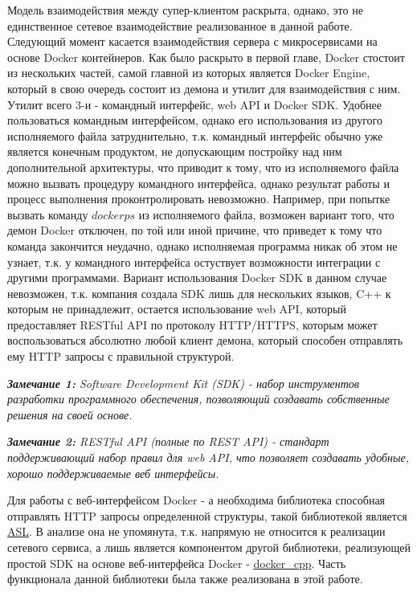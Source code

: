 \documentclass[a4paper, 14pt]{extreport}
\begin{document}
\par Модель взаимодействия между супер-клиентом раскрыта, однако, это не единственное сетевое взаимодействие реализованное в данной работе.
Следующий момент касается взаимодействия сервера с микросервисами на основе Docker контейнеров. Как было раскрыто в первой главе, Docker 
стостоит из нескольких частей, самой главной из которых является Docker Engine, который в свою очередь состоит из демона и утилит для 
взаимодействия с ним. Утилит всего 3-и - командный интерфейс, web API и Docker SDK. Удобнее пользоваться командным интерфейсом, однако его 
использования из другого исполняемого файла затруднительно, т.к. командный интерфейс обычно уже является конечным продуктом, не допускающим
постройку над ним дополнительной архитектуры, что приводит к тому, что из исполняемого файла можно вызвать процедуру командного интерфейса,
однако результат работы и процесс выполнения проконтролировать невозможно. Например, при попытке вызвать команду \(docker  ps\) из 
исполняемого файла, возможен вариант того, что демон Docker отключен, по той или иной причине, что приведет к тому что команда закончится 
неудачно, однако исполняемая программа никак об этом не узнает, т.к. у командного интерфейса остуствует возможности интеграции с другими 
программами. Вариант использования Docker SDK в данном случае невозможен, т.к. компания создала SDK лишь для нескольких языков, C++ к 
которым не принадлежит, остается использование web API, который предоставляет RESTful API по протоколу HTTP/HTTPS, которым может
воспользоваться абсолютно любой клиент демона, который способен отправлять ему HTTP запросы с правильной структурой.
\par\noindent \textsl{\textbf{Замечание 1:} Software Development Kit (SDK) - набор инструментов разработки программного обеспечения,
позволяющий создавать собственные решения на своей основе.}
\par\noindent \textsl{\textbf{Замечание 2:} RESTful API (полные по REST API) - стандарт поддерживающий набор правил для web API, что 
позволяет создавать удобные, хорошо поддерживаемые веб интерфейсы.}
\par Для работы с веб-интерфейсом Docker - а необходима библиотека способная отправлять HTTP запросы определенной структуры, такой 
библиотекой является \href{https://github.com/aslze/asl}{ASL}. В анализе она не упомянута, т.к. напрямую не относится к реализации 
сетевого сервиса, а лишь является компонентом другой библиотеки, реализующей простой SDK на основе веб-интерфейса Docker -
\href{https://github.com/sees1/docker_cpp}{docker\_cpp}. Часть функционала данной библиотеки была также реализована в этой работе.
\end{document}
